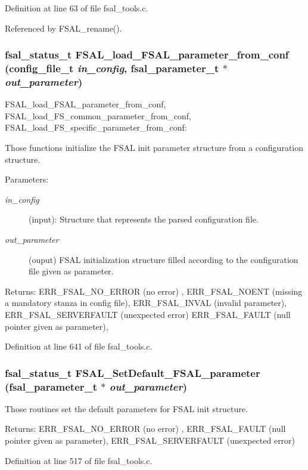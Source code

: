 Definition at line 63 of file fsal\_\-tools.c.

Referenced by FSAL\_\-rename().
\subsubsection{\setlength{\rightskip}{0pt plus 5cm}fsal\_\-status\_\-t FSAL\_\-load\_\-FSAL\_\-parameter\_\-from\_\-conf (config\_\-file\_\-t {\em in\_\-config}, fsal\_\-parameter\_\-t $\ast$ {\em out\_\-parameter})}\label{fsal__tools_8c_a13}


FSAL\_\-load\_\-FSAL\_\-parameter\_\-from\_\-conf, FSAL\_\-load\_\-FS\_\-common\_\-parameter\_\-from\_\-conf, FSAL\_\-load\_\-FS\_\-specific\_\-parameter\_\-from\_\-conf:

Those functions initialize the FSAL init parameter structure from a configuration structure.

\begin{Desc}
\item[Parameters:]
\begin{description}
\item[{\em in\_\-config}](input): Structure that represents the parsed configuration file. \item[{\em out\_\-parameter}](ouput) FSAL initialization structure filled according to the configuration file given as parameter.\end{description}
\end{Desc}
\begin{Desc}
\item[Returns:]ERR\_\-FSAL\_\-NO\_\-ERROR (no error) , ERR\_\-FSAL\_\-NOENT (missing a mandatory stanza in config file), ERR\_\-FSAL\_\-INVAL (invalid parameter), ERR\_\-FSAL\_\-SERVERFAULT (unexpected error) ERR\_\-FSAL\_\-FAULT (null pointer given as parameter), \end{Desc}


Definition at line 641 of file fsal\_\-tools.c.
\subsubsection{\setlength{\rightskip}{0pt plus 5cm}fsal\_\-status\_\-t FSAL\_\-Set\-Default\_\-FSAL\_\-parameter (fsal\_\-parameter\_\-t $\ast$ {\em out\_\-parameter})}\label{fsal__tools_8c_a10}


Those routines set the default parameters for FSAL init structure. \begin{Desc}
\item[Returns:]ERR\_\-FSAL\_\-NO\_\-ERROR (no error) , ERR\_\-FSAL\_\-FAULT (null pointer given as parameter), ERR\_\-FSAL\_\-SERVERFAULT (unexpected error) \end{Desc}


Definition at line 517 of file fsal\_\-tools.c.